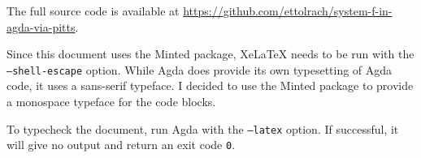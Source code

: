 \documentclass[logo,bsc,singlespacing,parskip,online]{infthesis}
\begin{document}
The full source code is available at \url{https://github.com/ettolrach/system-f-in-agda-via-pitts}.

Since this document uses the Minted package, XeLaTeX needs to be run with the
\texttt{--shell-escape} option. While Agda does provide its own typesetting of Agda code, it uses a
sans-serif typeface. I decided to use the Minted package to provide a monospace typeface for the
code blocks.

To typecheck the document, run Agda with the \texttt{--latex} option. If successful, it will give no
output and return an exit code \texttt{0}.
\end{document}
